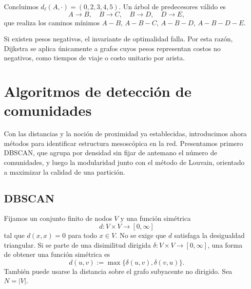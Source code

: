 \begin{ejemplo}
                \medskip
                Concluimos $d_\ell(A,\cdot)=(0,2,3,4,5)$. Un árbol de predecesores válido es
                \[
                A\to B,\quad B\to C,\quad B\to D,\quad D\to E,
                \]
                que realiza los caminos mínimos $A\!-\!B$, $A\!-\!B\!-\!C$, $A\!-\!B\!-\!D$, $A\!-\!B\!-\!D\!-\!E$.
            \end{ejemplo}

            \begin{observacion}[Limitación]
                Si existen pesos negativos, el invariante de optimalidad falla. Por esta razón, Dijkstra se aplica únicamente a grafos cuyos pesos representan costos no negativos, como tiempos de viaje o costo unitario por arista.
            \end{observacion}

    \section{Algoritmos de detección de comunidades}
        Con las distancias y la noción de proximidad ya establecidas, introducimos ahora métodos para identificar estructura mesoscópica en la red. Presentamos primero DBSCAN, que agrupa por densidad sin fijar de antemano el número de comunidades, y luego la modularidad junto con el método de Louvain, orientado a maximizar la calidad de una partición.

        \subsection{DBSCAN}

            \begin{definicion}
                Fijamos un conjunto finito de nodos $V$ y una función simétrica
                \[
                    d:V\times V\to[0,\infty]
                \]
                tal que $d(x,x)=0$ para todo $x\in V$. No se exige que $d$ satisfaga la desigualdad triangular. Si se parte de una disimilitud dirigida $\delta:V\times V\to[0,\infty]$, una forma de obtener una función simétrica es
                \[
                d(u,v):=\max\{\delta(u,v),\delta(v,u)\}.
                \]
                También puede usarse la distancia sobre el grafo subyacente no dirigido. Sea $N=|V|$.
            \end{definicion}

